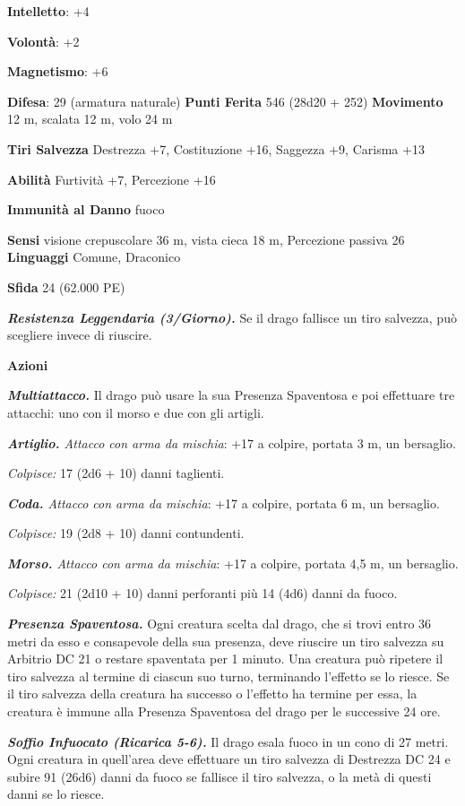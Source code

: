 \begin{multicols}{2}
\textbf{Intelletto}: +4

\textbf{Volontà}: +2

\textbf{Magnetismo}: +6

\textbf{Difesa}: 29 (armatura naturale) \textbf{Punti Ferita}
546 (28d20 + 252) \textbf{Movimento} 12 m, scalata 12 m, volo 24 m

\textbf{Tiri Salvezza} Destrezza +7, Costituzione +16, Saggezza +9,
Carisma +13

\textbf{Abilità} Furtività +7, Percezione +16

\textbf{Immunità al Danno} fuoco

\textbf{Sensi} visione crepuscolare 36 m, vista cieca 18 m, Percezione passiva
26 \textbf{Linguaggi} Comune, Draconico

\textbf{Sfida} 24 (62.000 PE)

\emph{\textbf{Resistenza Leggendaria (3/Giorno).}} Se il drago fallisce
un tiro salvezza, può scegliere invece di riuscire.

\textbf{Azioni}

\emph{\textbf{Multiattacco.}} Il drago può usare la sua Presenza
Spaventosa e poi effettuare tre attacchi: uno con il morso e due con gli
artigli.

\emph{\textbf{Artiglio.} Attacco con arma da mischia}: +17 a colpire,
portata 3 m, un bersaglio.

\emph{Colpisce:} 17 (2d6 + 10) danni taglienti.

\emph{\textbf{Coda.} Attacco con arma da mischia}: +17 a colpire,
portata 6 m, un bersaglio.

\emph{Colpisce:} 19 (2d8 + 10) danni contundenti.

\emph{\textbf{Morso.} Attacco con arma da mischia}: +17 a colpire,
portata 4,5 m, un bersaglio.

\emph{Colpisce:} 21 (2d10 + 10) danni perforanti più 14 (4d6) danni da
fuoco.

\emph{\textbf{Presenza Spaventosa.}} Ogni creatura scelta dal drago, che
si trovi entro 36 metri da esso e consapevole della sua presenza, deve
riuscire un tiro salvezza su Arbitrio DC 21 o restare spaventata per 1
minuto. Una creatura può ripetere il tiro salvezza al termine di ciascun
suo turno, terminando l'effetto se lo riesce. Se il tiro salvezza della
creatura ha successo o l'effetto ha termine per essa, la creatura è
immune alla Presenza Spaventosa del drago per le successive 24 ore.

\emph{\textbf{Soffio Infuocato (Ricarica 5-6).}} Il drago esala fuoco in
un cono di 27 metri. Ogni creatura in quell'area deve effettuare un tiro
salvezza di Destrezza DC 24 e subire 91 (26d6) danni da fuoco se
fallisce il tiro salvezza, o la metà di questi danni se lo riesce.


\end{multicols}
